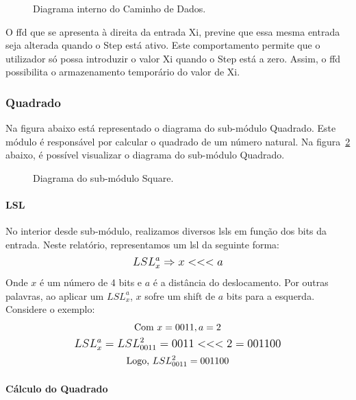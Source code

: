 \begin{figure}[H]
    \centering
    
    \caption{Diagrama interno do Caminho de Dados.}\label{fig:DataPath_inside}
\end{figure}

O \gls{ffd} que se apresenta à direita da entrada Xi, previne que essa mesma entrada seja alterada quando o Step está ativo. Este comportamento permite que o utilizador só possa introduzir o valor Xi quando o Step está a zero. Assim, o \gls{ffd} possibilita o armazenamento temporário do valor de Xi.

\subsubsection{Quadrado}

Na figura abaixo está representado o diagrama do sub-módulo Quadrado. Este módulo é responsável por calcular o quadrado de um número natural. Na figura~\ref{fig:Quadrado} abaixo, é possível visualizar o diagrama do sub-módulo Quadrado.


\begin{figure}[H]
    \centering
    
    \caption{Diagrama do sub-módulo Square.}\label{fig:Quadrado}
\end{figure}

\paragraph{LSL}

No interior desde sub-módulo, realizamos diversos \Glspl{lsl} em função dos bits da entrada. Neste relatório, representamos um \Gls{lsl} da seguinte forma:
\begin{gather}
    \mathlarger{
        LSL_x^a \Rightarrow x <<< a}
\end{gather}
Onde $x$ é um número de 4 bits e $a$ é a distância do deslocamento. Por outras palavras, ao aplicar um $LSL_x^a$, $x$ sofre um shift de $a$ bits para a esquerda. Considere o exemplo:
\begin{gather}
    \text{Com $x = 0011, a = 2$} \\
    \mathlarger{LSL_x^a = LSL_{0011}^2 = 0011 <<< 2 = 001100} \\
    \text{Logo, $LSL_{0011}^2 = 001100$}
\end{gather}

\paragraph{Cálculo do Quadrado}

